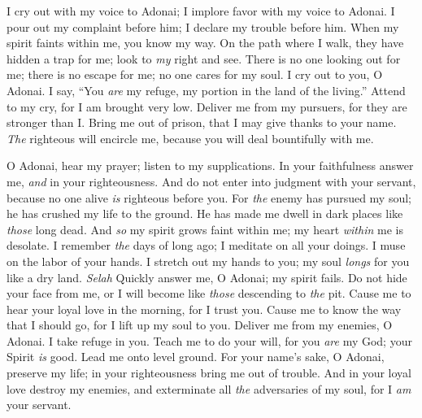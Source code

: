 \begin{biblechapter} %
 I cry out with my voice to Adonai; 
I implore favor with my voice to Adonai.
\verse I pour out my complaint before him; 
I declare my trouble before him.
\verse When my spirit faints within me, 
you know my way. 
On the path where I walk, 
they have hidden a trap for me;
\verse look to \textit{my} right and see. 
There is no one looking out for me; 
there is no escape for me; 
no one cares for my soul.
\verse I cry out to you, O Adonai. 
I say, “You \textit{are} my refuge, 
my portion in the land of the living.”
\verse Attend to my cry, 
for I am brought very low. 
Deliver me from my pursuers, 
for they are stronger than I.
\verse Bring me out of prison, 
that I may give thanks to your name. 
\textit{The} righteous will encircle me, 
because you will deal bountifully with me.
\end{biblechapter}

\begin{biblechapter} %
 O Adonai, hear my prayer; 
listen to my supplications. 
In your faithfulness answer me, 
\textit{and} in your righteousness.
\verse And do not enter into judgment with your servant, 
because no one alive \textit{is} righteous before you.
\verse For \textit{the} enemy has pursued my soul; 
he has crushed my life to the ground. 
He has made me dwell in dark places 
like \textit{those} long dead.
\verse And \textit{so} my spirit grows faint within me; 
my heart \textit{within} me is desolate.
\verse I remember \textit{the} days of long ago; 
I meditate on all your doings. 
I muse on the labor of your hands.
\verse I stretch out my hands to you; 
my soul \textit{longs} for you like a dry land. \textit{Selah}
\verse Quickly answer me, O Adonai; 
my spirit fails. 
Do not hide your face from me, 
or I will become 
like \textit{those} descending to \textit{the} pit.
\verse Cause me to hear your loyal love in the morning, 
for I trust you. 
Cause me to know the way that I should go, 
for I lift up my soul to you.
\verse Deliver me from my enemies, O Adonai. 
I take refuge in you.
\verse Teach me to do your will, for you \textit{are} my God; 
your Spirit \textit{is} good. 
Lead me onto level ground.
\verse For your name’s sake, O Adonai, preserve my life; 
in your righteousness bring me out of trouble.
\verse And in your loyal love destroy my enemies, 
and exterminate all \textit{the} adversaries of my soul, 
for I \textit{am} your servant.
\end{biblechapter}

